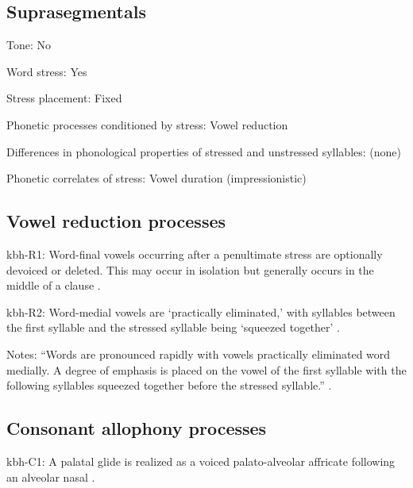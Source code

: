 {\subsection*{Suprasegmentals}
\begin{appendixdesc}
\item[Tone:] No

\item[Word stress:] Yes

\item[Stress placement:] Fixed

\item[Phonetic processes conditioned by stress:] Vowel reduction

\item[Differences in phonological properties of stressed and unstressed syllables:] (none)

\item[Phonetic correlates of stress:] Vowel duration (impressionistic)
\end{appendixdesc}
\subsection*{Vowel reduction processes}
\begin{appendixdesc}

\item[kbh-R1:] Word-final vowels occurring after a penultimate stress are optionally devoiced or deleted. This may occur in isolation but generally occurs in the middle of a clause \citep[86]{Howard1967}.

\item[kbh-R2:] Word-medial vowels are ‘practically eliminated,’ with syllables between the first syllable and the stressed syllable being ‘squeezed together’ \citep[86--87]{Howard1967}.

\item[Notes:] “Words are pronounced rapidly with vowels practically eliminated word medially. A degree of emphasis is placed on the vowel of the first syllable with the following syllables squeezed together before the stressed syllable.” \citep[86--87]{Howard1967}.
\end{appendixdesc}
\subsection*{Consonant allophony processes}
\begin{appendixdesc}

\item[kbh-C1:] A palatal glide is realized as a voiced palato-alveolar affricate following an alveolar nasal \citep{Howard1967}.


\end{appendixdesc}}
